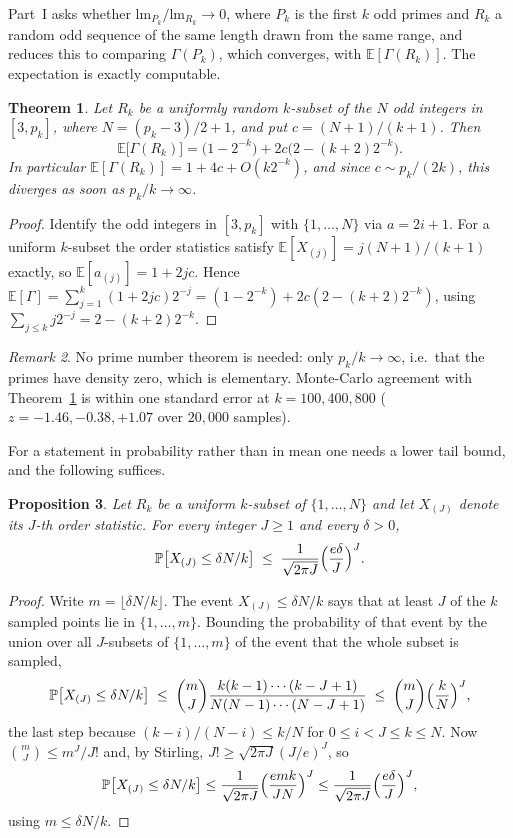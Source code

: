 \documentclass[11pt,a4paper]{article}
\theoremstyle{plain}
\newtheorem{theorem}{Theorem}[section]
\newtheorem{proposition}[theorem]{Proposition}
\theoremstyle{definition}
\theoremstyle{remark}
\newtheorem{remark}[theorem]{Remark}
\begin{document}
Part~I asks whether $\mathrm{lm}_{P_k}/\mathrm{lm}_{R_k}\to0$,
where $P_k$ is the first $k$ odd primes and $R_k$ a random odd sequence of the
same length drawn from the same range, and reduces this to comparing
$\Gamma(P_k)$, which converges, with $\mathbb{E}[\Gamma(R_k)]$. The expectation
is exactly computable.

\begin{theorem}\label{thm:p5exact}
Let $R_k$ be a uniformly random $k$-subset of the $N$ odd integers in
$[3,p_k]$, where $N=(p_k-3)/2+1$, and put $c=(N+1)/(k+1)$. Then
\[
  \mathbb{E}\bigl[\Gamma(R_k)\bigr]
   =\bigl(1-2^{-k}\bigr)+2c\bigl(2-(k+2)2^{-k}\bigr).
\]
In particular $\mathbb{E}[\Gamma(R_k)]=1+4c+O(k2^{-k})$, and since
$c\sim p_k/(2k)$, this diverges as soon as $p_k/k\to\infty$.
\end{theorem}

\begin{proof}
Identify the odd integers in $[3,p_k]$ with $\{1,\dots,N\}$ via $a=2i+1$. For a
uniform $k$-subset the order statistics satisfy $\mathbb{E}[X_{(j)}]=j(N+1)/(k+1)$
exactly, so $\mathbb{E}[a_{(j)}]=1+2jc$. Hence
$\mathbb{E}[\Gamma]=\sum_{j=1}^{k}(1+2jc)2^{-j}
=(1-2^{-k})+2c(2-(k+2)2^{-k})$, using $\sum_{j\le k}j2^{-j}=2-(k+2)2^{-k}$.
\end{proof}

\begin{remark}
No prime number theorem is needed: only $p_k/k\to\infty$, i.e.\ that the primes
have density zero, which is elementary. Monte-Carlo agreement with
Theorem~\ref{thm:p5exact} is within one standard error at $k=100,400,800$
($z=-1.46,-0.38,+1.07$ over $20{,}000$ samples).
\end{remark}

For a statement in probability rather than in mean one needs a lower tail bound,
and the following suffices.

\begin{proposition}\label{prop:p5tail}
Let $R_k$ be a uniform $k$-subset of $\{1,\dots,N\}$ and let $X_{(J)}$ denote its
$J$-th order statistic. For every integer $J\ge1$ and every $\delta>0$,
\[
  \mathbb{P}\bigl[X_{(J)}\le\delta N/k\bigr]
   \;\le\;\frac{1}{\sqrt{2\pi J}}\Bigl(\frac{e\delta}{J}\Bigr)^{J}.
\]
\end{proposition}

\begin{proof}
Write $m=\lfloor\delta N/k\rfloor$. The event $X_{(J)}\le\delta N/k$ says that at
least $J$ of the $k$ sampled points lie in $\{1,\dots,m\}$. Bounding the
probability of that event by the union over all $J$-subsets of $\{1,\dots,m\}$ of
the event that the whole subset is sampled,
\[
  \mathbb{P}\bigl[X_{(J)}\le\delta N/k\bigr]
  \;\le\;\binom{m}{J}\frac{k(k-1)\cdots(k-J+1)}{N(N-1)\cdots(N-J+1)}
  \;\le\;\binom{m}{J}\Bigl(\frac{k}{N}\Bigr)^{J},
\]
the last step because $(k-i)/(N-i)\le k/N$ for $0\le i<J\le k\le N$. Now
$\binom{m}{J}\le m^{J}/J!$ and, by Stirling, $J!\ge\sqrt{2\pi J}(J/e)^{J}$, so
\[
  \mathbb{P}\bigl[X_{(J)}\le\delta N/k\bigr]
  \le\frac{1}{\sqrt{2\pi J}}\Bigl(\frac{emk}{JN}\Bigr)^{J}
  \le\frac{1}{\sqrt{2\pi J}}\Bigl(\frac{e\delta}{J}\Bigr)^{J},
\]
using $m\le\delta N/k$.
\end{proof}
\end{document}
